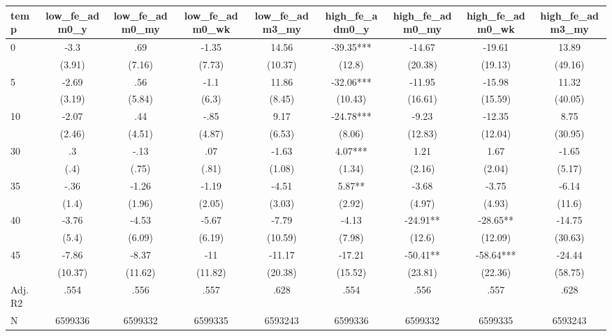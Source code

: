 \documentclass[]{article}
\begin{document}
\begin{tabular}{lcccccccc} \hline
temp & low\_fe\_adm0\_y & low\_fe\_adm0\_my & low\_fe\_adm0\_wk & low\_fe\_adm3\_my & high\_fe\_adm0\_y & high\_fe\_adm0\_my & high\_fe\_adm0\_wk & high\_fe\_adm3\_my \\ \hline
0 & -3.3 & .69 & -1.35 & 14.56 & -39.35*** & -14.67 & -19.61 & 13.89 \\
 & (3.91) & (7.16) & (7.73) & (10.37) & (12.8) & (20.38) & (19.13) & (49.16) \\
5 & -2.69 & .56 & -1.1 & 11.86 & -32.06*** & -11.95 & -15.98 & 11.32 \\
 & (3.19) & (5.84) & (6.3) & (8.45) & (10.43) & (16.61) & (15.59) & (40.05) \\
10 & -2.07 & .44 & -.85 & 9.17 & -24.78*** & -9.23 & -12.35 & 8.75 \\
 & (2.46) & (4.51) & (4.87) & (6.53) & (8.06) & (12.83) & (12.04) & (30.95) \\
30 & .3 & -.13 & .07 & -1.63 & 4.07*** & 1.21 & 1.67 & -1.65 \\
 & (.4) & (.75) & (.81) & (1.08) & (1.34) & (2.16) & (2.04) & (5.17) \\
35 & -.36 & -1.26 & -1.19 & -4.51 & 5.87** & -3.68 & -3.75 & -6.14 \\
 & (1.4) & (1.96) & (2.05) & (3.03) & (2.92) & (4.97) & (4.93) & (11.6) \\
40 & -3.76 & -4.53 & -5.67 & -7.79 & -4.13 & -24.91** & -28.65** & -14.75 \\
 & (5.4) & (6.09) & (6.19) & (10.59) & (7.98) & (12.6) & (12.09) & (30.63) \\
45 & -7.86 & -8.37 & -11 & -11.17 & -17.21 & -50.41** & -58.64*** & -24.44 \\
 & (10.37) & (11.62) & (11.82) & (20.38) & (15.52) & (23.81) & (22.36) & (58.75) \\
\hline Adj. R2 & .554 & .556 & .557 & .628 & .554 & .556 & .557 & .628 \\
 N & 6599336 & 6599332 & 6599335 & 6593243 & 6599336 & 6599332 & 6599335 & 6593243 \\ \hline
\end{tabular}
\end{document}
